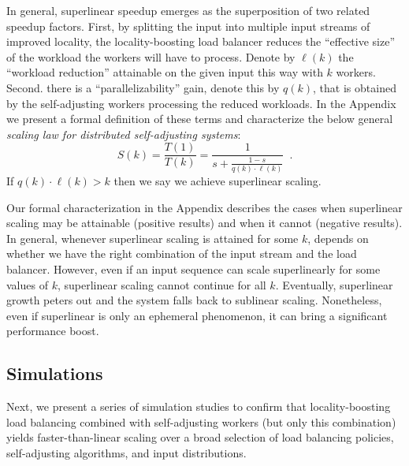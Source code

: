 In general, superlinear speedup emerges as the superposition of two related speedup factors. First, by splitting the input into multiple input streams of improved locality, the locality-boosting load balancer reduces the ``effective size'' of the workload the workers will have to process. Denote by $\ell(k)$ the ``workload reduction'' attainable on the given input this way with $k$ workers. Second. there is a ``parallelizability'' gain, denote this by $q(k)$, that is obtained by the self-adjusting workers processing the reduced workloads.  In the Appendix we present a formal definition of these terms and characterize the below general \emph{scaling law for distributed self-adjusting systems}:
\begin{displaymath}
    S(k) = \frac{T(1)}{T(k)} = \frac{1}{s + \frac{1-s}{q(k) \cdot \ell(k)}} \enspace .
\end{displaymath}
If $q(k) \cdot \ell(k) > k$ then we say we achieve superlinear scaling.

Our formal characterization in the Appendix describes the cases when superlinear scaling may be attainable (positive results) and when it cannot (negative results). In general, whenever superlinear scaling is attained for some $k$, depends on whether we have the right combination of the input stream and the load balancer.  However, even if an input sequence can scale superlinearly for some values of $k$, superlinear scaling cannot continue for all $k$. Eventually, superlinear growth peters out and the system falls back to sublinear scaling. Nonetheless, even if superlinear is only an ephemeral phenomenon, it can bring a significant performance boost.


\subsection{Simulations}
\label{sec:sims}

Next, we present a series of simulation studies to confirm that locality-boosting load balancing combined with self-adjusting workers (but only this combination) yields faster-than-linear scaling over a broad selection of load balancing policies, self-adjusting algorithms, and input distributions.

